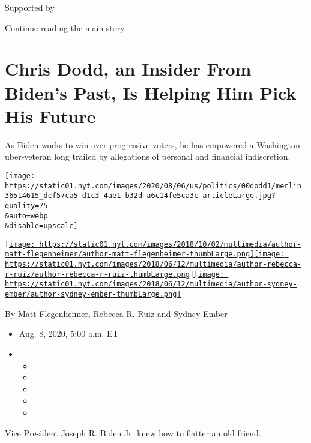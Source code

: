 Supported by

\protect\hyperlink{after-sponsor}{Continue reading the main story}

\hypertarget{chris-dodd-an-insider-from-bidens-past-is-helping-him-pick-his-future}{%
\section{Chris Dodd, an Insider From Biden's Past, Is Helping Him Pick
His
Future}\label{chris-dodd-an-insider-from-bidens-past-is-helping-him-pick-his-future}}

As Biden works to win over progressive voters, he has empowered a
Washington uber-veteran long trailed by allegations of personal and
financial indiscretion.

\texttt{[image: https://static01.nyt.com/images/2020/08/06/us/politics/00dodd1/merlin\_36514615\_dcf57ca5-d1c3-4ae1-b32d-a6c14fe5ca3c-articleLarge.jpg?quality=75\\\&auto=webp\\\&disable=upscale]}

\href{https://www.nytimes.com/by/matt-flegenheimer}{\texttt{[image: https://static01.nyt.com/images/2018/10/02/multimedia/author-matt-flegenheimer/author-matt-flegenheimer-thumbLarge.png]}}\href{https://www.nytimes.com/by/rebecca-r-ruiz}{\texttt{[image: https://static01.nyt.com/images/2018/06/12/multimedia/author-rebecca-r-ruiz/author-rebecca-r-ruiz-thumbLarge.png]}}\href{https://www.nytimes.com/by/sydney-ember}{\texttt{[image: https://static01.nyt.com/images/2018/06/12/multimedia/author-sydney-ember/author-sydney-ember-thumbLarge.png]}}

By \href{https://www.nytimes.com/by/matt-flegenheimer}{Matt
Flegenheimer}, \href{https://www.nytimes.com/by/rebecca-r-ruiz}{Rebecca
R. Ruiz} and \href{https://www.nytimes.com/by/sydney-ember}{Sydney
Ember}

\begin{itemize}
\item
  Aug. 8, 2020, 5:00 a.m. ET
\item
  \begin{itemize}
  \item
  \item
  \item
  \item
  \item
  \end{itemize}
\end{itemize}

Vice President Joseph R. Biden Jr. knew how to flatter an old friend.

